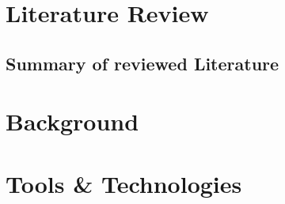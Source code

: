 \section{Literature Review}
\subsection{Summary of reviewed Literature}

\section{Background}
\section{Tools \& Technologies}